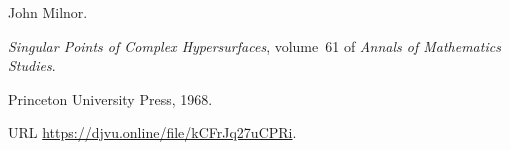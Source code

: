 John Milnor.

\newblock \emph{Singular Points of Complex Hypersurfaces}, volume~61 of
  \emph{Annals of Mathematics Studies}.

\newblock Princeton University Press, 1968.

\newblock URL \url{https://djvu.online/file/kCFrJq27uCPRi}.

